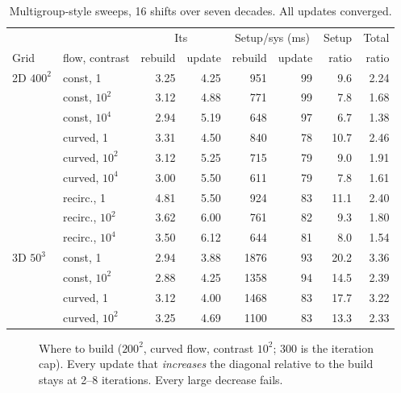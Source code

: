 \documentclass[11pt,a4paper]{article}
\begin{document}
\begin{table}[h]\centering\small
\begin{tabular}{llrrrrrr}
\toprule
 & & \multicolumn{2}{c}{Its} & \multicolumn{2}{c}{Setup/sys (ms)} & Setup & Total\\
Grid & flow, contrast & rebuild & update & rebuild & update & ratio & ratio\\\midrule
2D $400^2$ & const, 1      & 3.25 & 4.25 & 951 & 99 & 9.6 & 2.24\\
           & const, $10^2$ & 3.12 & 4.88 & 771 & 99 & 7.8 & 1.68\\
           & const, $10^4$ & 2.94 & 5.19 & 648 & 97 & 6.7 & 1.38\\
           & curved, 1     & 3.31 & 4.50 & 840 & 78 & 10.7 & 2.46\\
           & curved, $10^2$& 3.12 & 5.25 & 715 & 79 & 9.0 & 1.91\\
           & curved, $10^4$& 3.00 & 5.50 & 611 & 79 & 7.8 & 1.61\\
           & recirc., 1    & 4.81 & 5.50 & 924 & 83 & 11.1 & 2.40\\
           & recirc., $10^2$& 3.62 & 6.00 & 761 & 82 & 9.3 & 1.80\\
           & recirc., $10^4$& 3.50 & 6.12 & 644 & 81 & 8.0 & 1.54\\\midrule
3D $50^3$  & const, 1      & 2.94 & 3.88 & 1876 & 93 & 20.2 & 3.36\\
           & const, $10^2$ & 2.88 & 4.25 & 1358 & 94 & 14.5 & 2.39\\
           & curved, 1     & 3.12 & 4.00 & 1468 & 83 & 17.7 & 3.22\\
           & curved, $10^2$& 3.25 & 4.69 & 1100 & 83 & 13.3 & 2.33\\
\bottomrule
\end{tabular}
\caption{Multigroup-style sweeps, 16 shifts over seven decades. All updates converged.}\label{tab:mg}
\end{table}

\begin{figure}[h]\centering
{}
\caption{Where to build ($200^2$, curved flow, contrast $10^2$; 300 is the iteration cap). Every update that \emph{increases} the diagonal relative to the build stays at 2--8 iterations. Every large decrease fails.}\label{fig:build}
\end{figure}
\end{document}
